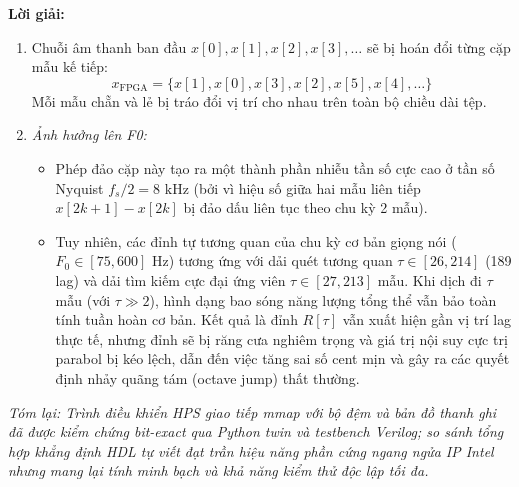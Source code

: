 \noindent\textbf{Lời giải:}
\begin{enumerate}[label=(\alph*), itemsep=2pt]
    \item Chuỗi âm thanh ban đầu $x[0], x[1], x[2], x[3], \dots$ sẽ bị hoán đổi từng cặp mẫu kế tiếp:
    \begin{equation}
    x_{\text{FPGA}} = \{x[1], x[0], x[3], x[2], x[5], x[4], \dots\}
    \end{equation}
    Mỗi mẫu chẵn và lẻ bị tráo đổi vị trí cho nhau trên toàn bộ chiều dài tệp.
    \item \emph{Ảnh hưởng lên F0:}
    \begin{itemize}[leftmargin=1.2em, itemsep=2pt]
        \item Phép đảo cặp này tạo ra một thành phần nhiễu tần số cực cao ở tần số Nyquist $f_s / 2 = 8\text{ kHz}$ (bởi vì hiệu số giữa hai mẫu liên tiếp $x[2k+1] - x[2k]$ bị đảo dấu liên tục theo chu kỳ 2 mẫu).
        \item Tuy nhiên, các đỉnh tự tương quan của chu kỳ cơ bản giọng nói ($F_0 \in [75, 600]\text{ Hz}$) tương ứng với dải quét tương quan $\tau \in [26, 214]$ (189 lag) và dải tìm kiếm cực đại ứng viên $\tau \in [27, 213]$ mẫu.
        Khi dịch đi $\tau$ mẫu (với $\tau \gg 2$), hình dạng bao sóng năng lượng tổng thể vẫn bảo toàn tính tuần hoàn cơ bản. Kết quả là đỉnh $R[\tau]$ vẫn xuất hiện gần vị trí lag thực tế, nhưng đỉnh sẽ bị răng cưa nghiêm trọng và giá trị nội suy cực trị parabol bị kéo lệch, dẫn đến việc tăng sai số cent mịn và gây ra các quyết định nhảy quãng tám (octave jump) thất thường.
    \end{itemize}
\end{enumerate}

\textit{Tóm lại: Trình điều khiển HPS giao tiếp mmap với bộ đệm và bản đồ thanh ghi đã được kiểm chứng bit-exact qua Python twin và testbench Verilog; so sánh tổng hợp khẳng định HDL tự viết đạt trần hiệu năng phần cứng ngang ngửa IP Intel nhưng mang lại tính minh bạch và khả năng kiểm thử độc lập tối đa.}
